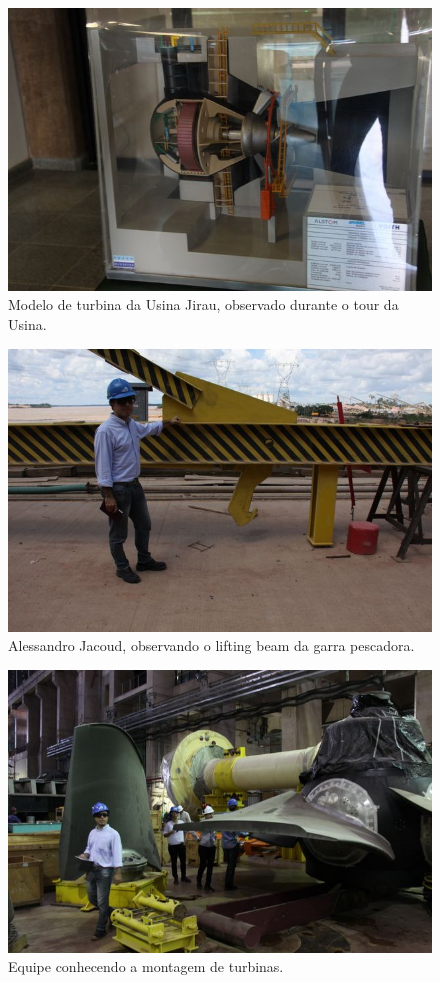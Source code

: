  \begin{figure}[ht!]
    \centering \includegraphics[width=0.6\columnwidth]{figs/jirau/jirau_02}
    \caption{Modelo de turbina da Usina Jirau, observado durante o tour da Usina.}
    \label{fig:jirau2}
\end{figure}

\begin{figure}[ht!]
    \centering \includegraphics[width=0.6\columnwidth]{figs/jirau/jirau_03}
    \caption{Alessandro Jacoud, observando o lifting beam da garra pescadora.}
    \label{fig:jirau3}
\end{figure}


\begin{figure}[ht!]
    \centering \includegraphics[width=0.6\columnwidth]{figs/jirau/jirau_06}
    \caption{Equipe conhecendo a montagem de turbinas.}
    \label{fig:jirau6}
\end{figure}



